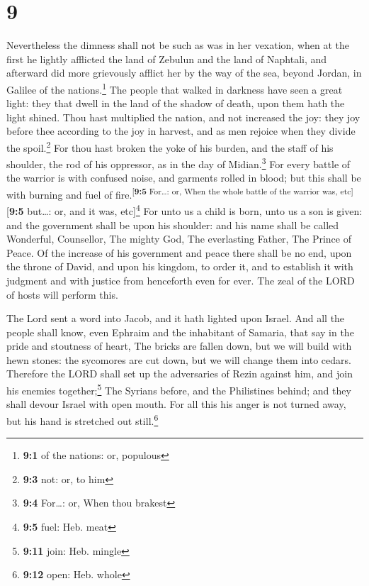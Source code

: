 \hypertarget{section-8}{%
\section{9}\label{section-8}}

 Nevertheless the dimness shall not be such as was in her
vexation, when at the first he lightly afflicted the land of Zebulun and
the land of Naphtali, and afterward did more grievously afflict her by
the way of the sea, beyond Jordan, in Galilee of the nations.\footnote{\textbf{9:1}
  of the nations: or, populous}  The people that walked in
darkness have seen a great light: they that dwell in the land of the
shadow of death, upon them hath the light shined.  Thou
hast multiplied the nation, and not increased the joy: they joy before
thee according to the joy in harvest, and as men rejoice when they
divide the spoil.\footnote{\textbf{9:3} not: or, to him} 
For thou hast broken the yoke of his burden, and the staff of his
shoulder, the rod of his oppressor, as in the day of Midian.\footnote{\textbf{9:4}
  For\ldots: or, When thou brakest}  For every battle of
the warrior is with confused noise, and garments rolled in blood; but
this shall be with burning and fuel of
fire.\textsuperscript{{[}\textbf{9:5} For\ldots: or, When the whole
battle of the warrior was, etc{]}}{[}\textbf{9:5} but\ldots: or, and it
was, etc{]}\footnote{\textbf{9:5} fuel: Heb. meat}  For
unto us a child is born, unto us a son is given: and the government
shall be upon his shoulder: and his name shall be called Wonderful,
Counsellor, The mighty God, The everlasting Father, The Prince of Peace.
 Of the increase of his government and peace there shall
be no end, upon the throne of David, and upon his kingdom, to order it,
and to establish it with judgment and with justice from henceforth even
for ever. The zeal of the LORD of hosts will perform this.

 The Lord sent a word into Jacob, and it hath lighted upon
Israel.  And all the people shall know, even Ephraim and
the inhabitant of Samaria, that say in the pride and stoutness of heart,
 The bricks are fallen down, but we will build with hewn
stones: the sycomores are cut down, but we will change them into cedars.
 Therefore the LORD shall set up the adversaries of Rezin
against him, and join his enemies together;\footnote{\textbf{9:11} join:
  Heb. mingle}  The Syrians before, and the Philistines
behind; and they shall devour Israel with open mouth. For all this his
anger is not turned away, but his hand is stretched out
still.\footnote{\textbf{9:12} open: Heb. whole}

